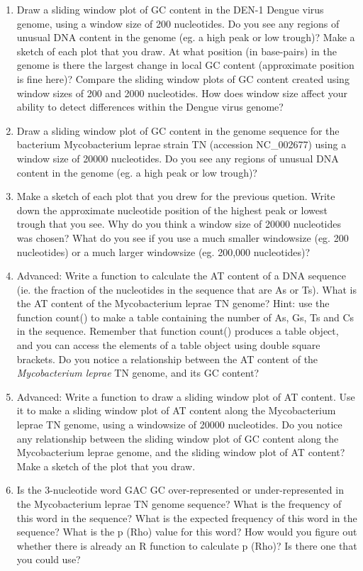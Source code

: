 \documentclass[
]{book}
\providecommand{\tightlist}{%
  \setlength{\itemsep}{0pt}\setlength{\parskip}{0pt}}
\begin{document}
\begin{enumerate}
\def\labelenumi{\arabic{enumi}.}
\tightlist
\item
  Draw a sliding window plot of GC content in the DEN-1 Dengue virus genome, using a window size of 200 nucleotides. Do you see any regions of unusual DNA content in the genome (eg. a high peak or low trough)?
  Make a sketch of each plot that you draw. At what position (in base-pairs) in the genome is there the largest change in local GC content (approximate position is fine here)? Compare the sliding window plots of GC content created using window sizes of 200 and 2000 nucleotides. How does window size affect your ability to detect differences within the Dengue virus genome?
\item
  Draw a sliding window plot of GC content in the genome sequence for the bacterium Mycobacterium leprae strain TN (accession NC\_002677) using a window size of 20000 nucleotides. Do you see any regions of unusual DNA content in the genome (eg. a high peak or low trough)?
\item
  Make a sketch of each plot that you drew for the previous quetion. Write down the approximate nucleotide position of the highest peak or lowest trough that you see. Why do you think a window size of 20000 nucleotides was chosen? What do you see if you use a much smaller windowsize (eg. 200 nucleotides) or a much larger windowsize (eg. 200,000 nucleotides)?
\item
  Advanced: Write a function to calculate the AT content of a DNA sequence (ie. the fraction of the nucleotides in the sequence that are As or Ts). What is the AT content of the Mycobacterium leprae TN genome? Hint: use the function count() to make a table containing the number of As, Gs, Ts and Cs in the sequence. Remember that function count() produces a table object, and you can access the elements of a table object using double square brackets. Do you notice a relationship between the AT content of the \emph{Mycobacterium leprae} TN genome, and its GC content?
\item
  Advanced: Write a function to draw a sliding window plot of AT content. Use it to make a sliding window plot of AT content along the Mycobacterium leprae TN genome, using a windowsize of 20000 nucleotides. Do you notice any relationship between the sliding window plot of GC content along the Mycobacterium leprae genome, and the sliding window plot of AT content? Make a sketch of the plot that you draw.
\item
  Is the 3-nucleotide word GAC GC over-represented or under-represented in the Mycobacterium leprae TN genome sequence? What is the frequency of this word in the sequence? What is the expected frequency of this word in the sequence? What is the p (Rho) value for this word? How would you figure out whether there is already an R function to calculate p (Rho)? Is there one that you could use?
\end{enumerate}
\end{document}
